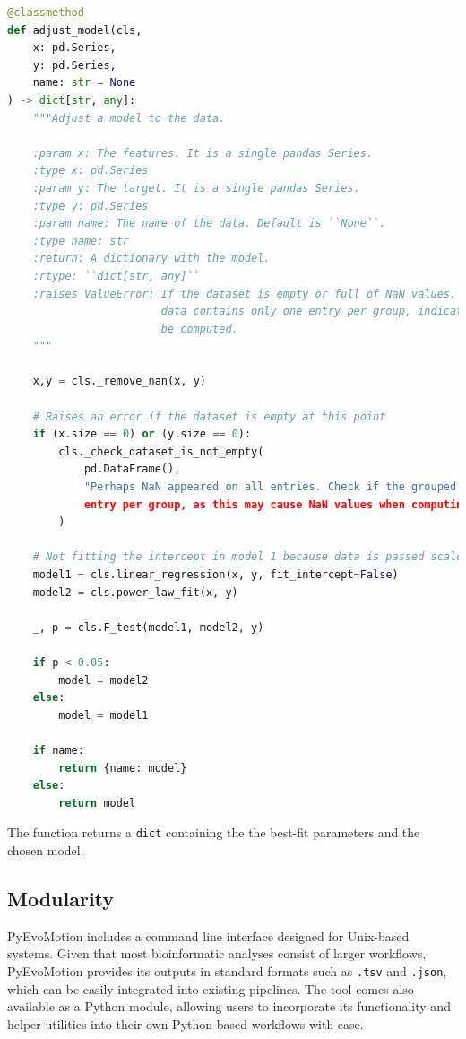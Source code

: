 \begin{lstlisting}[language=Python, caption={Linear (null) and power-law (challenging) model fitting to the data, and F-test procedure for model comparison.}]
@classmethod
def adjust_model(cls,
    x: pd.Series,
    y: pd.Series,
    name: str = None
) -> dict[str, any]:
    """Adjust a model to the data.

    :param x: The features. It is a single pandas Series.
    :type x: pd.Series
    :param y: The target. It is a single pandas Series.
    :type y: pd.Series
    :param name: The name of the data. Default is ``None``.
    :type name: str
    :return: A dictionary with the model.   
    :rtype: ``dict[str, any]``
    :raises ValueError: If the dataset is empty or full of NaN values. This may occur if the grouped
                        data contains only one entry per group, indicating that the variance cannot
                        be computed.
    """

    x,y = cls._remove_nan(x, y)

    # Raises an error if the dataset is empty at this point
    if (x.size == 0) or (y.size == 0):
        cls._check_dataset_is_not_empty(
            pd.DataFrame(),
            "Perhaps NaN appeared on all entries. Check if the grouped data contains only one
            entry per group, as this may cause NaN values when computing the variance."
        )

    # Not fitting the intercept in model 1 because data is passed scaled to the minimum
    model1 = cls.linear_regression(x, y, fit_intercept=False) 
    model2 = cls.power_law_fit(x, y)

    _, p = cls.F_test(model1, model2, y)

    if p < 0.05:
        model = model2
    else:
        model = model1

    if name:
        return {name: model}
    else:
        return model
\end{lstlisting}


The function returns a \texttt{dict} containing the the best-fit parameters and the chosen model.



\subsection{Modularity}

PyEvoMotion includes a command line interface designed for Unix-based systems. Given that most bioinformatic analyses consist of larger workflows, PyEvoMotion provides its outputs in standard formats such as \texttt{.tsv} and \texttt{.json}, which can be easily integrated into existing pipelines. The tool comes also available as a Python module, allowing users to incorporate its functionality and helper utilities into their own Python-based workflows with ease.

